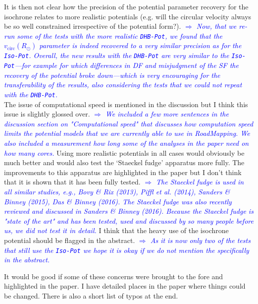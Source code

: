 \documentclass[10pt,a4paper]{article}
\newcommand{\Comment}[1]{\textsl{\textcolor{Blue}{$\Longrightarrow$ {#1}}}}
\newcommand{\RM}{{\sl RoadMapping}}
\begin{document}
\begin{itemize}
It is then not clear how the precision of the potential parameter recovery for the isochrone relates to more realistic potentials (e.g. will the circular velocity always be so well constrained irrespective of the potential form?). \Comment{Now, that we re-run some of the tests with the more realistic \texttt{DHB-Pot}, we found that the $v_\text{circ}(R_\odot)$ parameter is indeed recovered to a very similar precision as for the \texttt{Iso-Pot}. Overall, the new results with the \texttt{DHB-Pot} are very similar to the \texttt{Iso-Pot}---for example for which differences in DF and misjudgment of the SF the recovery of the potential broke down---which is very encouraging for the transferability of the results, also considering the tests that we could not repeat with the \texttt{DHB-Pot}.}\\
The issue of computational speed is mentioned in the discussion but I think this issue is slightly glossed over. \Comment{We included a few more sentences in the discussion section on "Computational speed" that discusses how computation speed limits the potential models that we are currently able to use in \RM{}. We also included a measurement how long some of the analyses in the paper need on how many cores.}
Using more realistic potentials in all cases would obviously be much better and would also test the `Staeckel fudge'
apparatus more fully. The improvements to this apparatus are highlighted in the paper but I don't think that it is shown that it has been fully tested. \Comment{The \emph{Staeckel fudge} is used in all similar studies, e.g., Bovy \& Rix (2013), Piffl et al. (2014), Sanders \& Binney (2015), Das \& Binney (2016). The \emph{Staeckel fudge} was also recently reviewed and discussed in Sanders \& Binney (2016). Because the \emph{Staeckel fudge} is "state of the art" and has been tested, used and discussed by so many people before us, we did not test it in detail.} I think that the heavy use of the isochrone potential should be flagged in the abstract. \Comment{As it is now only two of the tests that still use the \texttt{Iso-Pot} we hope it is okay if we do not mention the \text{Iso-Pot} specifically in the abstract.}
\end{itemize}

It would be good if some of these concerns were brought to the fore and highlighted
in the paper. I have detailed places in the paper where things could be changed.
There is also a short list of typos at the end.\\\\
\end{document}
